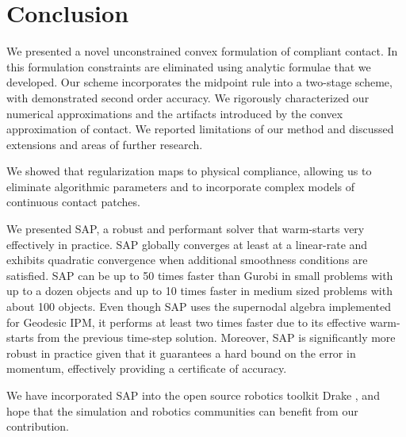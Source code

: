 \section{Conclusion}
\label{sec:future_directions}

We presented a novel unconstrained convex formulation of compliant contact. In
this formulation constraints are eliminated using analytic formulae that we
developed. Our scheme incorporates the midpoint rule into a two-stage scheme,
with demonstrated second order accuracy. We rigorously characterized our
numerical approximations and the artifacts introduced by the convex
approximation of contact. We reported limitations of our method and discussed
extensions and areas of further research.

We showed that regularization maps to physical compliance, allowing us to
eliminate algorithmic parameters and to incorporate complex models of continuous
contact patches.

We presented SAP, a robust and performant solver that warm-starts very
effectively in practice. SAP globally converges at least at a linear-rate and
exhibits quadratic convergence when additional smoothness conditions are
satisfied. SAP can be up to 50 times faster than Gurobi in small problems with
up to a dozen objects and up to 10 times faster in medium sized problems with
about 100 objects. Even though SAP uses the supernodal algebra implemented for
Geodesic IPM, it performs at least two times faster due to its effective
warm-starts from the previous time-step solution. Moreover, SAP is significantly
more robust in practice given that it guarantees a hard bound on the error in
momentum, effectively providing a certificate of accuracy.

We have incorporated SAP into the open source robotics toolkit Drake
\cite{bib:drake}, and hope that the simulation and robotics communities can
benefit from our contribution.
